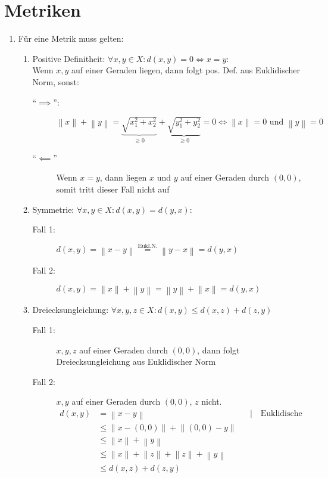 \documentclass[sectionformat=aufgabe]{gadsescript}
\begin{document}
\maketitle

\section{Metriken}
\begin{enumerate}[label=(\alph*)]
	\item Für eine Metrik muss gelten:
		\begin{enumerate}[label=(\roman*)]
			\item Positive Definitheit: $ \forall x, y \in X : d(x ,y) = 0 \iff x = y $:\\
				Wenn $ x, y $ auf einer Geraden liegen, dann folgt pos. Def. aus Euklidischer Norm, sonst:
				\begin{description}
					\item[``$ \implies $'':] $ \left\| x \right\| + \left\| y \right\| = \underbrace{\sqrt{x_1^2 + x_2^2}}_{\geq 0} + \underbrace{\sqrt{y_1^2 + y_2^2} }_{\geq 0} = 0 \iff \left\| x \right\| = 0 \text{ und } \left\| y \right\| = 0 $
					\item[``$ \impliedby $''] Wenn $ x = y $, dann liegen $ x $ und $ y $ auf einer Geraden durch $ (0, 0) $, somit tritt dieser Fall nicht auf
				\end{description}
			\item Symmetrie: $ \forall x, y \in X: d(x, y) = d(y, x) $:
				\begin{description}
					\item[Fall 1:] $ d(x, y) = \left\| x - y \right\| \overset{\text{Eukl.N.} }{=} \left\| y - x \right\| = d(y, x) $ 
					\item[Fall 2:] $ d(x, y) = \left\| x \right\| + \left\| y \right\| = \left\| y \right\| + \left\| x \right\| = d(y, x) $
				\end{description}
			\item Dreiecksungleichung: $ \forall x, y, z \in X: d(x, y) \leq d(x, z) + d(z, y) $ 
				\begin{description}
					\item[Fall 1:] $ x, y, z $ auf einer Geraden durch $ (0,0) $, dann folgt Dreiecksungleichung aus Euklidischer Norm
					\item[Fall 2:] $ x, y $ auf einer Geraden durch $ (0, 0) $, $ z $ nicht.
						\begin{align*}
							d(x, y) &= \left\| x - y \right\| && | \quad \text{Euklidische Norm}  \\
								&\leq \left\| x - (0, 0) \right\| + \left\| (0, 0) - y \right\| \\
								&\leq \left\| x \right\| + \left\| y \right\| \\
								&\leq \left\| x \right\| + \left\| z \right\| + \left\| z \right\| + \left\| y \right\| \\
								&\leq d(x, z) + d(z, y)
						\end{align*}
						

\end{description}
\end{enumerate}
\end{enumerate}
\end{document}

